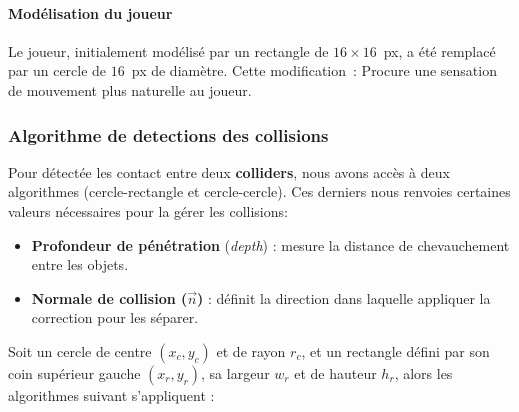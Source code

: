\documentclass[a4paper,11pt]{article}
\begin{document}
\paragraph{Modélisation du joueur}
Le joueur, initialement modélisé par un rectangle de \(16 \times 16\)~px, a été remplacé par un cercle de \(16\)~px de diamètre. Cette modification~: Procure une sensation de mouvement plus naturelle au joueur.

\subsubsection{Algorithme de detections des collisions}
Pour détectée les contact entre deux \textbf{colliders}, nous avons accès à deux algorithmes (cercle-rectangle et cercle-cercle). Ces derniers nous renvoies certaines valeurs nécessaires pour la gérer les collisions:
\begin{itemize}
\item \textbf{Profondeur de pénétration} (\textit{depth}) : mesure la distance de chevauchement entre les objets.
\item \textbf{Normale de collision (\(\vec{n}\))} : définit la direction dans laquelle appliquer la correction pour les séparer.
\end{itemize}

Soit un cercle de centre \((x_c, y_c)\) et de rayon \(r_c\), et un rectangle défini par son coin supérieur gauche \((x_r, y_r)\), sa largeur \(w_r\) et de hauteur \(h_r\), alors les algorithmes suivant s'appliquent :
\end{document}
